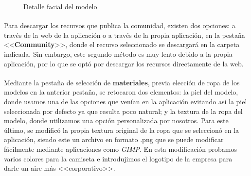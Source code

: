 \documentclass{subfiles}
\begin{document}
    \begin{figure}[H]
    \centering
    \caption{Detalle facial del modelo}
    \label{fig:4.1.face_detail}
    \end{figure}
    
    \paragraph{}
    Para descargar los recursos que publica la comunidad, existen dos opciones: a través de la web de la aplicación o a través de la propia aplicación, en la pestaña <<\textbf{Community}>>, donde el recurso seleccionado se descargará en la carpeta indicada. Sin embargo, este segundo método es muy lento debido a la propia aplicación, por lo que se optó por descargar los recursos directamente de la web.
    
    \paragraph{}
    Mediante la pestaña de selección de \textbf{materiales}, previa elección de ropa de los modelos en la anterior pestaña, se retocaron dos elementos: la piel del modelo, donde usamos una de las opciones que venían en la aplicación evitando así la piel seleccionada por defecto ya que resulta poco natural; y la textura de la ropa del modelo, donde utilizamos una opción personalizada por nosotros. Para este último, se modificó la propia textura original de la ropa que se seleccionó en la aplicación, siendo este un archivo en formato .png que se puede modificar fácilmente mediante aplicaciones como \textit{GIMP}. En esta modificación probamos varios colores para la camiseta e introdujimos el logotipo de la empresa para darle un aire más <<corporativo>>.
\end{document}

